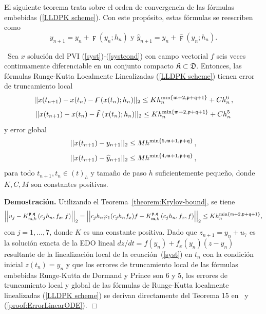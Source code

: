 El siguiente teorema trata sobre el orden de convergencia de las fórmulas embebidas (\ref{LLDPK scheme}). Con este propósito, estas fórmulas se reescriben como
\begin{equation*}
    y_{n+1}=y_{n}+\digamma (y_{n};h_{n})\text{ \ \ \ \ y \ \ \ \ }\widehat{y}_{n+1}=y_{n}+\widehat{\digamma }(y_{n};h_{n}).
\end{equation*}


\begin{theorem}\label{theorem:lldp-convergence}
	\cite{naranjo2021locally}~Sea $x$ solución del PVI (\ref{syst})-(\ref{systcond}) con campo vectorial $f$ seis veces continuamente diferenciable en un conjunto compacto $\mathfrak{K} \subset \mathfrak{D}$. Entonces, las fórmulas Runge-Kutta Localmente Linealizadas (\ref{LLDPK scheme}) tienen error de truncamiento local
	\[\lvert\lvert x(t_{n+1}) - x(t_n) - \digamma(x(t_n);h_n) \rvert\rvert_2 \leq Kh_n^{\mathrm{min}\left\{ \mathfrak{m}+2,\mathfrak{p}+\mathfrak{q}+1 \right\}}+C h_n^{6}\,,  \]
	\[\lvert\lvert x(t_{n+1}) - x(t_n) - \widehat{\digamma }(x(t_n);h_n) \rvert\rvert_2 \leq Kh_n^{\mathrm{min}\left\{ \mathfrak{m}+2,\mathfrak{p}+\mathfrak{q}+1 \right\}}+C h_n^{5}  \]
	y error global
	\[ \lvert\lvert x(t_{n+1}) - y_{n+1} \rvert\rvert_2 \leq M h^{\mathrm{min}\left\{5,\mathfrak{m}+1,\mathfrak{p}+\mathfrak{q} \right\}}\,, \]
	\[ \lvert\lvert x(t_{n+1}) - \widehat{y}_{n+1} \rvert\rvert_2 \leq M h^{\mathrm{min}\left\{ 4,\mathfrak{m}+1,\mathfrak{p}+\mathfrak{q} \right\}}\,, \]
	para todo $t_{n+1},t_n\in(t)_h$ y tamaño de paso $h$ suficientemente pequeño, donde  $K,C,M$ son constantes positivas.
\end{theorem}
\textbf{Demostración.} Utilizando el Teorema~\ref{theorem:Krylov-bound}, se tiene
\begin{equation}\label{proof:ErrorLinearODE}
\left\lvert \left\lvert  u_j-K_{\mathfrak{m},k}^{\mathfrak{p},\mathfrak{q}}\left(c_j h_n,f_x , f \right)  \right\rvert \right\rvert_2 =  \left\lvert \left\lvert c_jh_n\varphi_1(c_jh_nf_x)f - K_{\mathfrak{m},k}^{\mathfrak{p},\mathfrak{q}}\left(c_j h_n, f_x , f \right)  \right\rvert \right\rvert_2 \le Kh_n^{\mathrm{min}\left\{ \mathfrak{m}+2,\mathfrak{p}+\mathfrak{q}+1 \right\}},
\end{equation}
con $j=1,\ldots,7$, donde $K$ es una constante positiva. Dado que $z_{n+1} = y_n + u_7$ es la solución exacta de la EDO lineal $dz/dt=f(y_n)+f_x(y_n)(z-y_n)$ resultante de la linealización local de la ecuación~(\ref{syst}) en $t_n$ con la condición inicial $z(t_n)=y_n$ y que los errores de truncamiento local de las fórmulas embebidas Runge-Kutta de Dormand y Prince son 6 y 5, los errores de truncamiento local y global de las fórmulas de Runge-Kutta localmente linealizadas (\ref{LLDPK scheme}) se derivan directamente del Teorema 15 en~\cite{Jimenez13} y (\ref{proof:ErrorLinearODE}). $\Box$\\

